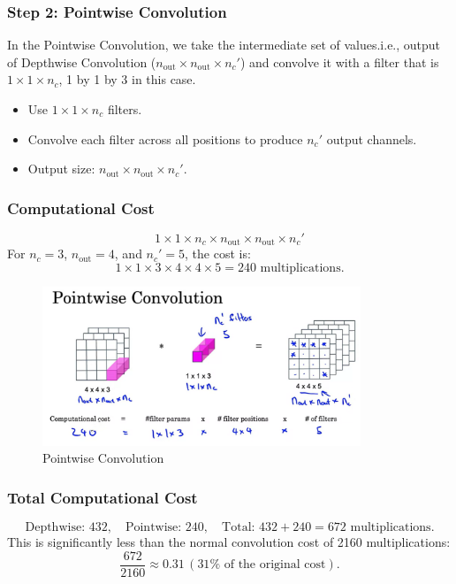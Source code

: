 \documentclass[letterpaper,12pt,notitlepage,twoside]{report}
\begin{document}
\subsubsection*{Step 2: Pointwise Convolution}
In the Pointwise Convolution, we take the intermediate set of values.i.e., output of Depthwise Convolution ($n_{\text{out}} \times n_{\text{out}} \times n_c'$) and convolve it with a filter that is $1 \times 1 \times n_c$, 1 by 1 by 3 in this case.
\begin{itemize}[nosep]
    \item Use $1 \times 1 \times n_c$ filters.
    \item Convolve each filter across all positions to produce $n_c'$ output channels.
    \item Output size: $n_{\text{out}} \times n_{\text{out}} \times n_c'$.
\end{itemize}

\subsubsection*{Computational Cost}
\[
1 \times 1 \times n_c \times n_{\text{out}} \times n_{\text{out}} \times n_c'
\]
For $n_c = 3$, $n_{\text{out}} = 4$, and $n_c' = 5$, the cost is:
\[
1 \times 1 \times 3 \times 4 \times 4 \times 5 = 240 \text{ multiplications.}
\]

\begin{figure}[h]
	\centering
	\includegraphics[width=0.85\textwidth]{Images/Pointwise Convolution.png}
	\caption{Pointwise Convolution}
	\label{fig:41}
\end{figure}
\FloatBarrier

\subsubsection*{Total Computational Cost}
\[
\text{Depthwise: } 432, \quad \text{Pointwise: } 240, \quad \text{Total: } 432 + 240 = 672 \text{ multiplications.}
\]
This is significantly less than the normal convolution cost of 2160 multiplications:
\[
\frac{672}{2160} \approx 0.31 \, (31\% \text{ of the original cost}).
\]
\end{document}
